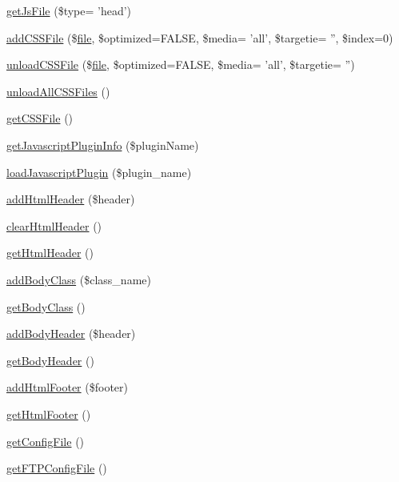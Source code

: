 \begin{DoxyCompactItemize}
\item 
\hyperlink{classContext_aa3844fdfe0768191c5cef3aef8db1115}{get\-Js\-File} (\$type= 'head')
\item 
\hyperlink{classContext_ac024e3744d631bf487ded23c2c6c7e24}{add\-C\-S\-S\-File} (\$\hyperlink{classfile}{file}, \$optimized=F\-A\-L\-S\-E, \$media= 'all', \$targetie= '', \$index=0)
\item 
\hyperlink{classContext_aa8ef9bdf406752ca2f6a9746e239eb4e}{unload\-C\-S\-S\-File} (\$\hyperlink{classfile}{file}, \$optimized=F\-A\-L\-S\-E, \$media= 'all', \$targetie= '')
\item 
\hyperlink{classContext_a9eb05677aeb2e95029a10919ffc6053f}{unload\-All\-C\-S\-S\-Files} ()
\item 
\hyperlink{classContext_a1b14cb135e24cc9c79414a50575cf309}{get\-C\-S\-S\-File} ()
\item 
\hyperlink{classContext_abf616bb3259e090c6e85b3aa1b581b60}{get\-Javascript\-Plugin\-Info} (\$plugin\-Name)
\item 
\hyperlink{classContext_acaea76bdc1334df9c2f088103d619593}{load\-Javascript\-Plugin} (\$plugin\-\_\-name)
\item 
\hyperlink{classContext_a26a1aea944ae54bb826500f544a67950}{add\-Html\-Header} (\$header)
\item 
\hyperlink{classContext_a5f0332b30b4ad65c0374ebd848c1dd98}{clear\-Html\-Header} ()
\item 
\hyperlink{classContext_a302e4b5d868e7a5c8bee216f774ca244}{get\-Html\-Header} ()
\item 
\hyperlink{classContext_ad266c6556167746e9368c4b1a7f6b16b}{add\-Body\-Class} (\$class\-\_\-name)
\item 
\hyperlink{classContext_a6562a2a894b2142362640e512bcf4e09}{get\-Body\-Class} ()
\item 
\hyperlink{classContext_ae7c9dad9ccd3e410283e21c67f395114}{add\-Body\-Header} (\$header)
\item 
\hyperlink{classContext_a991c9fc6985b78d817b6771092913975}{get\-Body\-Header} ()
\item 
\hyperlink{classContext_aa81925b1cc7e991c1c798e739fe048a4}{add\-Html\-Footer} (\$footer)
\item 
\hyperlink{classContext_ae7bb6879f84366eea76da3a7bf6a40bd}{get\-Html\-Footer} ()
\item 
\hyperlink{classContext_a7ac0928e07cfc7f19f9a7341c50b4811}{get\-Config\-File} ()
\item 
\hyperlink{classContext_ab7bb799f55be29174c8a15659dab823a}{get\-F\-T\-P\-Config\-File} ()

\end{DoxyCompactItemize}

